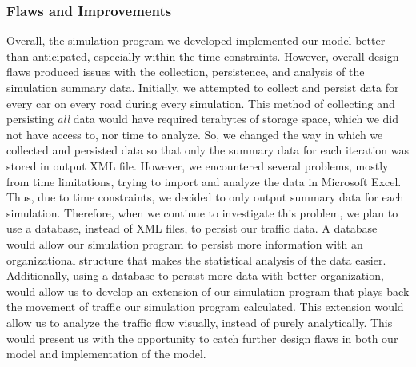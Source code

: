 \documentclass{amsart}
\begin{document}
		
			
		\subsubsection{Flaws and Improvements}
			Overall, the simulation program we developed implemented our model better than anticipated, especially within the time constraints. However, overall design flaws produced issues with the collection, persistence, and analysis of the simulation summary data. Initially, we attempted to collect and persist data for every car on every road during every simulation. This method of collecting and persisting \emph{all} data would have required terabytes of storage space, which we did not have access to, nor time to analyze. So, we changed the way in which we collected and persisted data so that only the summary data for each iteration was stored in output XML file. However, we encountered several problems, mostly from time limitations, trying to import and analyze the data in Microsoft Excel. Thus, due to time constraints, we decided to only output summary data for each simulation. Therefore, when we continue to investigate this problem, we plan to use a database, instead of XML files, to persist our traffic data. A database would allow our simulation program to persist more information with an organizational structure that makes the statistical analysis of the data easier. Additionally, using a database to persist more data with better organization, would allow us to develop an extension of our simulation program that plays back the movement of traffic our simulation program calculated. This extension would allow us to analyze the traffic flow visually, instead of purely analytically. This would present us with the opportunity to catch further design flaws in both our model and implementation of the model.	
			
\newpage
			
\end{document}
